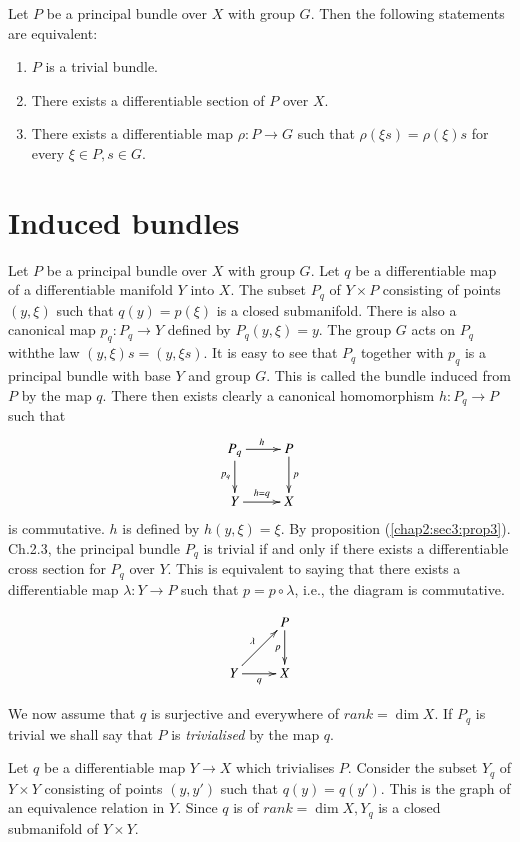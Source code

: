 \begin{proposition}\label{chap2:sec3:prop3} %
  Let $P$ be a principal bundle over $X$ with group $G$. Then the
  following statements are equivalent:  
  \begin{enumerate}[ 1)]
  \item $P$ is a trivial bundle. 
  \item There exists a differentiable section of $P$ over $X$. 
  \item There exists a differentiable map $\rho : P \to G$ such that
    $\rho ( \xi s) = \rho (\xi )s$ for every $\xi \in P, s \in G$.  
  \end{enumerate}
\end{proposition}

\section{Induced bundles}\label{chap2:sec4}

Let $P$ be a principal bundle over $X$ with group $G$. Let $q$ be a
differentiable map of a differentiable manifold $Y$ into $X$. The
subset $P_q$ of $Y \times  P$ consisting of points $(y, \xi)$ such
that $q(y) = p(\xi)$ is a closed submanifold. There is also a
canonical map $p_q : P_q \to Y$ defined by $P_q (y, \xi) = y$. The
group $G$ acts on $P_q$ with\pageoriginale the law $(y , \xi )s = (y, \xi s)$. It
is easy to see that $P_q$ together with $p_q$ is a principal bundle
with base $Y$ and group $G$. This is called the bundle induced from
$P$ by the map $q$. There then exists clearly a canonical homomorphism
$h : P_q \to P$ such that  
\[
\xymatrix{P_q \ar[d]_{p_q} \ar[r]^h & P\ar[d]^p\\
Y \ar[r]^{h= q} & X}
\]
is commutative. $h$ is defined by $h(y , \xi ) = \xi$. By proposition
(\ref{chap2:sec3:prop3}). Ch.2.3, the principal bundle $P_q$ is trivial if and only if
there exists a differentiable cross section for $P_q$ over $Y$. This
is equivalent to saying that there exists a differentiable map
$\lambda : Y \to P$ such that $p = p \circ  \lambda $, i.e., the diagram  is
commutative. 

\[
\xymatrix{& P\ar[d]_p\\
Y \ar[ur]^\lambda \ar[r]_q & X
}
\]

We now assume that $q$ is surjective and everywhere of $ rank = \dim X
$. If $P_q$ is trivial we shall say that $P$ is \textit{trivialised}
by the map $q$.

Let $q$ be a differentiable map $Y \to X$  which trivialises
$P$. Consider the subset $Y_q$ of $Y \times Y$ consisting of points
$(y, y')$ such that $q(y) = q(y')$. This is the graph of an
equivalence relation in $Y$. Since $q$ is of $rank = \dim X, Y_q$
is a closed submanifold of $Y \times Y$.

